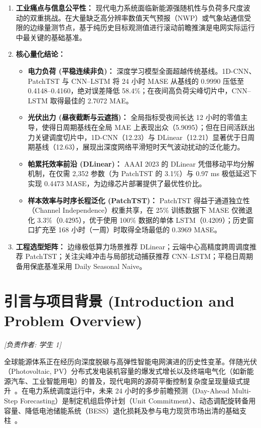 \documentclass[11pt,a4paper,UTF8]{ctexart}
\begin{document}
\begin{enumerate}
    \item \textbf{工业痛点与信息公平性：} 现代电力系统面临新能源强随机性与负荷多尺度波动的双重挑战。在大量缺乏高分辨率数值天气预报（NWP）或气象站通信受限的边缘量测节点，基于纯历史目标观测值进行滚动前瞻推演是电网实际运行中最关键的基础基准。
    \item \textbf{核心量化结论：}
    \begin{itemize}
        \item \textbf{电力负荷 (平稳连续非负)：} 深度学习模型全面超越传统基线。1D-CNN、PatchTST 与 CNN--LSTM 将 24 小时 MASE 从基线的 0.9990 压低至 0.4148--0.4160，绝对误差降低 58.4\%；在夜间高负荷尖峰切片中，CNN--LSTM 取得最佳的 2.7072 MAE。
        \item \textbf{光伏出力 (昼夜截断与云遮挡)：} 全局指标受夜间长达 12 小时的零值主导，使得日周期基线在全局 MAE 上表现出众（5.9095）；但在日间活跃出力关键调度切片中，1D-CNN（12.23）与 DLinear（12.21）显著优于日周期基线（12.63），展现出深度网络平滑短时天气波动扰动的泛化能力。
        \item \textbf{帕累托效率前沿 (DLinear)：} AAAI 2023 的 DLinear 凭借移动平均分解机制，在仅需 2,352 参数（为 PatchTST 的 3.1\%）与 0.97 ms 极低延迟下实现 0.4473 MASE，为边缘芯片部署提供了最优性价比。
        \item \textbf{样本效率与时序长程泛化 (PatchTST)：} PatchTST 得益于通道独立性（Channel Independence）权重共享，在 25\% 训练数据下 MASE 仅微退化 3.3\%（0.4295），优于使用 100\% 数据的单体 LSTM（0.4209）；历史窗口扩充至 168 小时（一周）时取得全场最低的 0.3969 MASE。
    \end{itemize}
    \item \textbf{工程选型矩阵：} 边缘极低算力场景推荐 DLinear；云端中心高精度跨周调度推荐 PatchTST；关注尖峰冲击与局部扰动捕获推荐 CNN--LSTM；平稳日周期备用保底基准采用 Daily Seasonal Naive。
\end{enumerate}

\section{引言与项目背景 (Introduction and Problem Overview)}
\label{sec:intro}
\noindent\textit{[负责作者: 学生 1]}

全球能源体系正在经历向深度脱碳与高弹性智能电网演进的历史性变革。伴随光伏（Photovoltaic, PV）分布式发电装机容量的爆发式增长以及终端电气化（如新能源汽车、工业智能用电）的普及，现代电网的源荷平衡控制复杂度呈现量级式提升~\cite{box2015time, zhang2014review}。在电力系统调度运行中，未来 24 小时的多步前瞻预测（Day-Ahead Multi-Step Forecasting）是制定机组启停计划（Unit Commitment）、动态调配旋转备用容量、降低电池储能系统（BESS）退化损耗及参与电力现货市场出清的基础支柱~\cite{lim2021time}。
\end{document}
